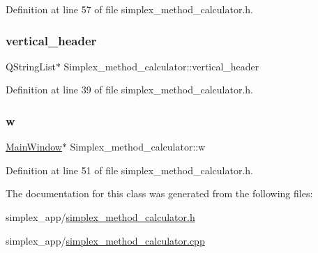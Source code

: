 Definition at line 57 of file simplex\+\_\+method\+\_\+calculator.\+h.

\mbox{\label{classSimplex__method__calculator_a55815e72c04855ae4ad91ec9f95c1db8}} 
\subsubsection{\texorpdfstring{vertical\+\_\+header}{vertical\_header}}
{\footnotesize\ttfamily Q\+String\+List$\ast$ Simplex\+\_\+method\+\_\+calculator\+::vertical\+\_\+header\hspace{0.3cm}{\ttfamily [private]}}



Definition at line 39 of file simplex\+\_\+method\+\_\+calculator.\+h.

\mbox{\label{classSimplex__method__calculator_ac37e43d93e0b32219606ece1b8fa82f9}} 
\subsubsection{\texorpdfstring{w}{w}}
{\footnotesize\ttfamily \hyperlink{classMainWindow}{Main\+Window}$\ast$ Simplex\+\_\+method\+\_\+calculator\+::w\hspace{0.3cm}{\ttfamily [private]}}



Definition at line 51 of file simplex\+\_\+method\+\_\+calculator.\+h.



The documentation for this class was generated from the following files\+:\begin{DoxyCompactItemize}
\item 
simplex\+\_\+app/\hyperlink{simplex__method__calculator_8h}{simplex\+\_\+method\+\_\+calculator.\+h}\item 
simplex\+\_\+app/\hyperlink{simplex__method__calculator_8cpp}{simplex\+\_\+method\+\_\+calculator.\+cpp}\end{DoxyCompactItemize}
